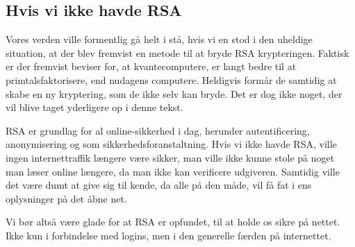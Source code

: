 \subsection{Hvis vi ikke havde RSA}
Vores verden ville formentlig gå helt i stå, hvis vi en stod i den uheldige situation, at der blev fremvist en metode til at bryde RSA krypteringen.
Faktisk er der fremvist beviser for, at kvantecomputere, er langt bedre til at primtalsfaktorisere, end nudagens computere.\cite{quantum}
Heldigvis formår de samtidig at skabe en ny kryptering, som de ikke selv kan bryde. Det er dog ikke noget, der vil blive taget yderligere op i denne tekst.

RSA er grundlag for al online-sikkerhed i dag, herunder autentificering, anonymisering og som sikkerhedsforanstaltning.
Hvis vi ikke havde RSA, ville ingen internettraffik længere være sikker, man ville ikke kunne stole på noget man læser online længere, da man ikke kan verificere udgiveren.
Samtidig ville det være dumt at give sig til kende, da alle på den måde, vil få fat i ens oplysninger på det åbne net.

Vi bør altså være glade for at RSA er opfundet, til at holde os sikre på nettet. Ikke kun i forbindelse med logins, men i den generelle færden på internettet.
